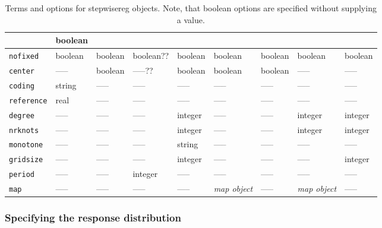 \begin{sidewaystable}
\begin{tabular}{|l||p{1.5cm}|p{1.5cm}|p{1.5cm}|p{1.5cm}|p{2cm}|p{1.5cm}|p{2cm}|p{2.5cm}|}
                    & boolean \\
\hline
 {\tt nofixed}      & boolean & boolean          & boolean?? & boolean                       & boolean & boolean & boolean
                    & boolean \\
\hline
 {\tt center}       & -----   & boolean          & -----?? & boolean                       & boolean & boolean & -----
                    & ----- \\
\hline
 {\tt coding}       & string  & -----            & -----   & -----                         & -----   & -----   & -----
                    & ----- \\
\hline
 {\tt reference}    & real    & -----            & -----   & -----                         & -----   & -----   & -----
                    & ----- \\
\hline
 {\tt degree}       & -----   & -----            & -----   & integer                       & -----   & -----   & integer
                    & integer \\
\hline
 {\tt nrknots}      & -----   & -----            & -----   & integer                       & -----   & -----   & integer
                    & integer \\
\hline
 {\tt monotone}     & -----   & -----            & -----   & string                        & -----   & -----   & -----
                    & ----- \\
\hline
 {\tt gridsize}     & -----   & -----            & -----   & integer                       & -----   & -----   & -----
                    & integer \\
\hline
 {\tt period}       & -----   & -----            & integer & -----                         & -----   & -----   & -----
                    & ----- \\
\hline
 {\tt map}          & -----   & -----            & -----   & -----                         & {\it map object} & -----   & {\it map object}
                    & ----- \\
\hline
\end{tabular}
{\em\centering \caption{\label{stepwiseregtermsoptions} Terms and options for
stepwisereg objects. Note, that boolean options are specified without supplying a value.}}
\end{sidewaystable}

\clearpage


\subsubsection{Specifying the response distribution}
 \label{stepwiseregfamilysyntax}

